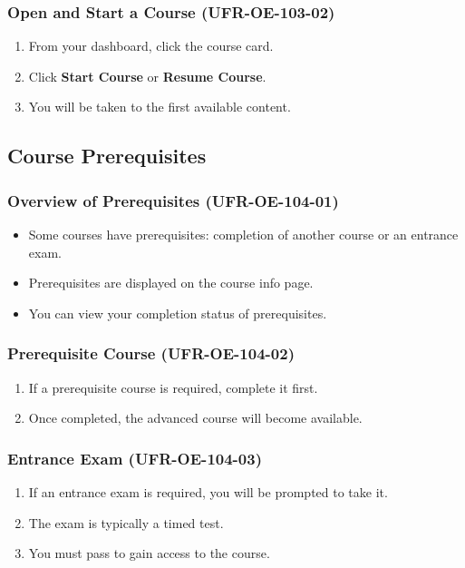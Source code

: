 \subsubsection{Open and Start a Course (UFR-OE-103-02)}
\begin{enumerate}
    \item From your dashboard, click the course card.
    \item Click \textbf{Start Course} or \textbf{Resume Course}.
    \item You will be taken to the first available content.
\end{enumerate}

\subsection{Course Prerequisites}

\subsubsection{Overview of Prerequisites (UFR-OE-104-01)}
\begin{itemize}
    \item Some courses have prerequisites: completion of another course or an entrance exam.
    \item Prerequisites are displayed on the course info page.
    \item You can view your completion status of prerequisites.
\end{itemize}

\subsubsection{Prerequisite Course (UFR-OE-104-02)}
\begin{enumerate}
    \item If a prerequisite course is required, complete it first.
    \item Once completed, the advanced course will become available.
\end{enumerate}

\subsubsection{Entrance Exam (UFR-OE-104-03)}
\begin{enumerate}
    \item If an entrance exam is required, you will be prompted to take it.
    \item The exam is typically a timed test.
    \item You must pass to gain access to the course.
\end{enumerate}

